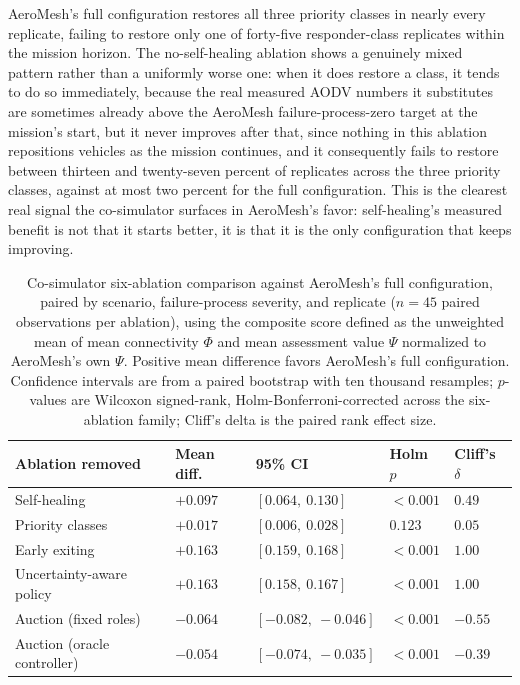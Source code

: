 \documentclass[drones,article,submit,moreauthors]{Definitions/mdpi}
\begin{document}
AeroMesh's full configuration restores all three priority classes in nearly every replicate, failing to restore only one of forty-five responder-class replicates within the mission horizon. The no-self-healing ablation shows a genuinely mixed pattern rather than a uniformly worse one: when it does restore a class, it tends to do so immediately, because the real measured AODV numbers it substitutes are sometimes already above the AeroMesh failure-process-zero target at the mission's start, but it never improves after that, since nothing in this ablation repositions vehicles as the mission continues, and it consequently fails to restore between thirteen and twenty-seven percent of replicates across the three priority classes, against at most two percent for the full configuration. This is the clearest real signal the co-simulator surfaces in AeroMesh's favor: self-healing's measured benefit is not that it starts better, it is that it is the only configuration that keeps improving.

\begin{table}[H]
\caption{Co-simulator six-ablation comparison against AeroMesh's full configuration, paired by scenario, failure-process severity, and replicate ($n=45$ paired observations per ablation), using the composite score defined as the unweighted mean of mean connectivity $\Phi$ and mean assessment value $\Psi$ normalized to AeroMesh's own $\Psi$. Positive mean difference favors AeroMesh's full configuration. Confidence intervals are from a paired bootstrap with ten thousand resamples; $p$-values are Wilcoxon signed-rank, Holm-Bonferroni-corrected across the six-ablation family; Cliff's delta is the paired rank effect size.}
\label{tab:cosimablation}
\begin{tabular}{p{3.0cm}p{1.6cm}p{2.6cm}p{1.4cm}p{1.3cm}}
\toprule
\textbf{Ablation removed} & \textbf{Mean diff.} & \textbf{95\% CI} & \textbf{Holm $p$} & \textbf{Cliff's $\delta$} \\
\midrule
Self-healing & $+0.097$ & $[0.064,\ 0.130]$ & $<0.001$ & $0.49$ \\
Priority classes & $+0.017$ & $[0.006,\ 0.028]$ & $0.123$ & $0.05$ \\
Early exiting & $+0.163$ & $[0.159,\ 0.168]$ & $<0.001$ & $1.00$ \\
Uncertainty-aware policy & $+0.163$ & $[0.158,\ 0.167]$ & $<0.001$ & $1.00$ \\
Auction (fixed roles) & $-0.064$ & $[-0.082,\ -0.046]$ & $<0.001$ & $-0.55$ \\
Auction (oracle controller) & $-0.054$ & $[-0.074,\ -0.035]$ & $<0.001$ & $-0.39$ \\
\bottomrule
\end{tabular}
\end{table}
\end{document}
